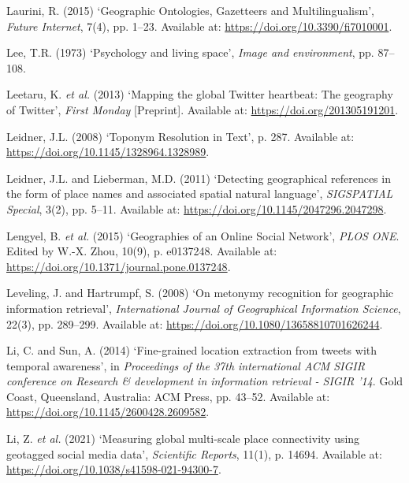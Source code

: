\documentclass[
  letterpaper,
  11pt,
  english,
  onehalfspacing,
  headsepline]{MastersDoctoralThesis}
\newlength{\cslhangindent}
\newlength{\cslentryspacingunit} %
\newenvironment{CSLReferences}[2] %
 {%
  \setlength{\parindent}{0pt}
  \ifodd #1
  \let\oldpar\par
  \def\par{\hangindent=\cslhangindent\oldpar}
  \fi
  \setlength{\parskip}{#2\cslentryspacingunit}
 }%
 {}
\begin{document}
\begin{CSLReferences}{0}{0}
\leavevmode{}%
Laurini, R. (2015) {`Geographic {Ontologies}, {Gazetteers} and
{Multilingualism}'}, \emph{Future Internet}, 7(4), pp. 1--23. Available
at: \url{https://doi.org/10.3390/fi7010001}.

\leavevmode{}%
Lee, T.R. (1973) {`Psychology and living space'}, \emph{Image and
environment}, pp. 87--108.

\leavevmode{}%
Leetaru, K. \emph{et al.} (2013) {`Mapping the global {Twitter}
heartbeat: {The} geography of {Twitter}'}, \emph{First Monday}
{[}Preprint{]}. Available at: \url{https://doi.org/201305191201}.

\leavevmode{}%
Leidner, J.L. (2008) {`Toponym {Resolution} in {Text}'}, p. 287.
Available at: \url{https://doi.org/10.1145/1328964.1328989}.

\leavevmode{}%
Leidner, J.L. and Lieberman, M.D. (2011) {`Detecting geographical
references in the form of place names and associated spatial natural
language'}, \emph{SIGSPATIAL Special}, 3(2), pp. 5--11. Available at:
\url{https://doi.org/10.1145/2047296.2047298}.

\leavevmode{}%
Lengyel, B. \emph{et al.} (2015) {`Geographies of an {Online Social
Network}'}, \emph{PLOS ONE}. Edited by W.-X. Zhou, 10(9), p. e0137248.
Available at: \url{https://doi.org/10.1371/journal.pone.0137248}.

\leavevmode{}%
Leveling, J. and Hartrumpf, S. (2008) {`On metonymy recognition for
geographic information retrieval'}, \emph{International Journal of
Geographical Information Science}, 22(3), pp. 289--299. Available at:
\url{https://doi.org/10.1080/13658810701626244}.

\leavevmode{}%
Li, C. and Sun, A. (2014) {`Fine-grained location extraction from tweets
with temporal awareness'}, in \emph{Proceedings of the 37th
international {ACM SIGIR} conference on {Research} \& development in
information retrieval - {SIGIR} '14}. {Gold Coast, Queensland,
Australia}: {ACM Press}, pp. 43--52. Available at:
\url{https://doi.org/10.1145/2600428.2609582}.

\leavevmode{}%
Li, Z. \emph{et al.} (2021) {`Measuring global multi-scale place
connectivity using geotagged social media data'}, \emph{Scientific
Reports}, 11(1), p. 14694. Available at:
\url{https://doi.org/10.1038/s41598-021-94300-7}.


\end{CSLReferences}
\end{document}
